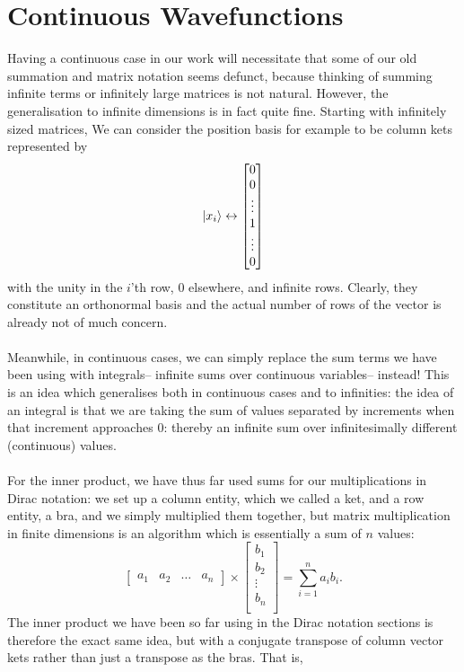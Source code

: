 \section{Continuous Wavefunctions}
Having a continuous case in our work will necessitate that some of our old summation and matrix notation seems defunct, because thinking of summing infinite terms or infinitely large matrices is not natural. However, the generalisation to infinite dimensions is in fact quite fine. Starting with infinitely sized matrices, We can consider the position basis for example to be column kets represented by 
$$
|x_{i}\rangle\leftrightarrow
\begin{bmatrix}0 \\ 0 \\ \vdots \\ 1 \\ \vdots \\ 0 \\ \end{bmatrix}
$$
with the unity in the $i$'th row, $0$ elsewhere, and infinite rows. Clearly, they constitute an orthonormal basis and the actual number of rows of the vector is already not of much concern. 
\\\\
Meanwhile, in continuous cases, we can simply replace the sum terms we have been using with integrals-- infinite sums over continuous variables-- instead! This is an idea which generalises both in continuous cases and to infinities: the idea of an integral is that we are taking the sum of values separated by increments when that increment approaches $0$: thereby an infinite sum over infinitesimally different (continuous) values.
\\\\
For the inner product, we have thus far used sums for our multiplications in Dirac notation: we set up a column entity, which we called a ket, and a row entity, a bra, and we simply multiplied them together, but matrix multiplication in finite dimensions is an algorithm which is essentially a sum of $n$ values:
$$
\begin{bmatrix}
a_{1} & a_{2} & \dots & a_{n}
\end{bmatrix}\times \begin{bmatrix}
b_{1}\\
b_{2}\\
\vdots\\
b_{n}\\
\end{bmatrix}=\sum_{i=1}^{n}a_{i}b_{i}.
$$
The inner product we have been so far using in the Dirac notation sections is therefore the exact same idea, but with a conjugate transpose of column vector kets rather than just a transpose as the bras. That is, 
